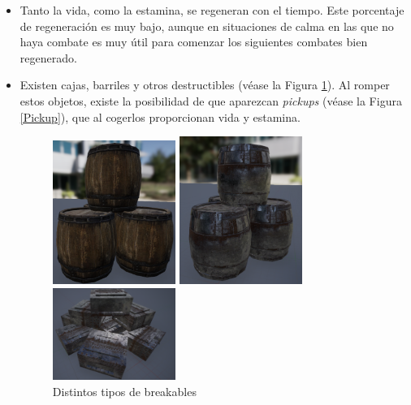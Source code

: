 \begin{itemize}
\item Tanto la vida, como la estamina, se regeneran con el tiempo. Este porcentaje de regeneración es muy bajo, aunque en situaciones de calma en las que no haya combate es muy útil para comenzar los siguientes combates bien regenerado.

\item Existen cajas, barriles y otros destructibles (véase la Figura \ref{Breakables}). Al romper estos objetos, existe la posibilidad de que aparezcan \textit{pickups} (véase la Figura \ref{Pickup}), que al cogerlos proporcionan vida y estamina.

\begin{figure}[H]
  \begin{minipage}{0.33\textwidth}
    \centering
    \includegraphics[width=4cm]{./images/Dest_Barr2.png}
  \end{minipage}%
  \hspace{0.5mm}
  \begin{minipage}{0.33\textwidth}
    \centering
    \includegraphics[width=4cm]{./images/Dest_Barr.png}
  \end{minipage}
  \hspace{0.5mm}
  \begin{minipage}{0.33\textwidth}
    \centering
    \includegraphics[width=4cm]{./images/Dest_Box.png}
  \end{minipage}
  \caption{Distintos tipos de breakables}
  \label{Breakables}
\end{figure}


\end{itemize}

